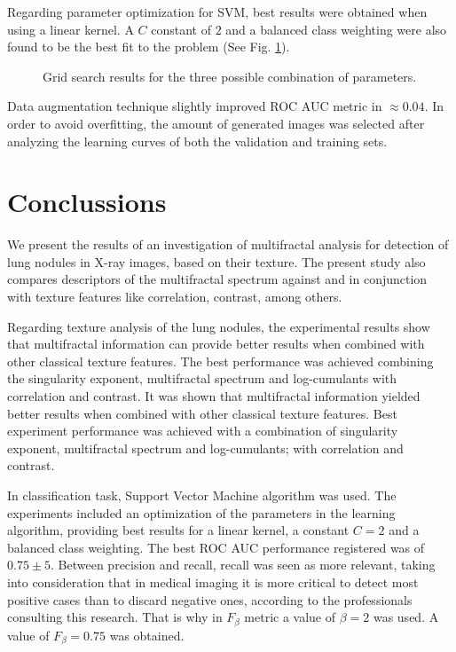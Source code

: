 \documentclass{article}
\begin{document}
Regarding parameter optimization for SVM, best results were obtained when using a linear kernel. A $C$ constant of $2$ and a balanced class weighting were also found to be the best fit to the problem (See Fig. \ref{grid_search}).  


\begin{figure}[ht]
	\centering
	\caption{Grid search results for the three possible combination of parameters. } \label{grid_search}
\end{figure}

Data augmentation technique slightly improved ROC AUC metric in $\approx 0.04$. In order to avoid overfitting, the amount of generated images was selected after analyzing the learning curves of both the validation and training sets. 

\section{Conclussions}
We present the results of an investigation of multifractal analysis for detection of lung nodules in X-ray images, based on their texture. The present study also compares descriptors of the multifractal spectrum against and in conjunction with texture features like correlation, contrast, among others.

Regarding texture analysis of the lung nodules, the experimental results show that multifractal information can provide better results when combined with other classical texture features. The best performance was achieved combining the singularity exponent, multifractal spectrum and log-cumulants with correlation and contrast. It was shown that multifractal information yielded better results when combined with other classical texture features. Best experiment performance was achieved with a combination of singularity exponent, multifractal spectrum and log-cumulants; with correlation and contrast. 

In classification task, Support Vector Machine algorithm was used. The experiments included an optimization of the parameters in the learning algorithm, providing best results for a linear kernel, a constant $C=2$ and a balanced class weighting. The best ROC AUC performance registered was of $0.75 \pm 5$. Between precision and recall, recall was seen as more relevant, taking into consideration that in medical imaging it is more critical to detect most positive cases than to discard negative ones, according to the professionals consulting this research. That is why in $F_\beta$ metric a value of $\beta = 2$ was used. A value of $F_\beta = 0.75$ was obtained. 
\end{document}
